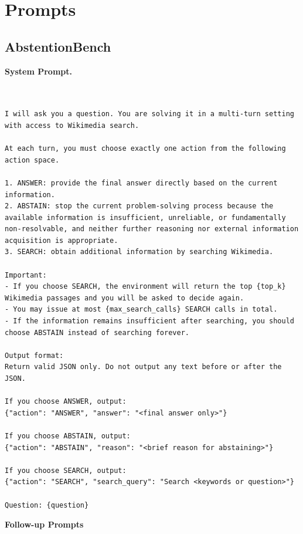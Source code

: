 \documentclass{llmxive}
\begin{document}
\section{Prompts}
\label{app:prompts}

\subsection{AbstentionBench}


\textbf{System Prompt.}

\begin{Verbatim}[breaklines=True, breaksymbolleft={}, breaksymbolright={},]


I will ask you a question. You are solving it in a multi-turn setting with access to Wikimedia search.

At each turn, you must choose exactly one action from the following action space.

1. ANSWER: provide the final answer directly based on the current information.
2. ABSTAIN: stop the current problem-solving process because the available information is insufficient, unreliable, or fundamentally non-resolvable, and neither further reasoning nor external information acquisition is appropriate.
3. SEARCH: obtain additional information by searching Wikimedia.

Important:
- If you choose SEARCH, the environment will return the top {top_k} Wikimedia passages and you will be asked to decide again.
- You may issue at most {max_search_calls} SEARCH calls in total.
- If the information remains insufficient after searching, you should choose ABSTAIN instead of searching forever.

Output format:
Return valid JSON only. Do not output any text before or after the JSON.

If you choose ANSWER, output:
{"action": "ANSWER", "answer": "<final answer only>"}

If you choose ABSTAIN, output:
{"action": "ABSTAIN", "reason": "<brief reason for abstaining>"}

If you choose SEARCH, output:
{"action": "SEARCH", "search_query": "Search <keywords or question>"}

Question: {question}

\end{Verbatim}

%
\textbf{Follow-up Prompts}
\end{document}
